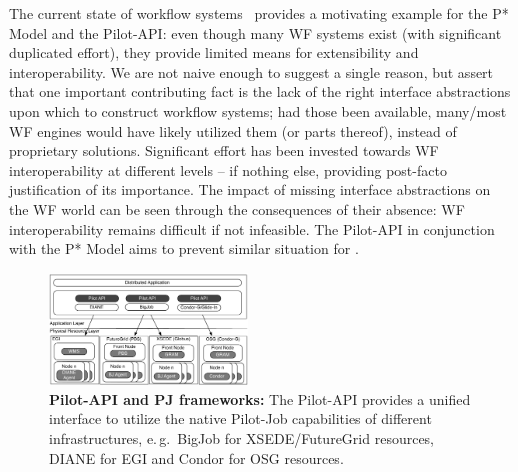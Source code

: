\documentclass{sig-alternate}
\begin{document}
The current state of workflow systems~\cite{nsf-workflow,1196459}
provides a motivating example for the P* Model and the Pilot-API:
even though many WF systems exist (with significant duplicated
effort), they provide limited means for extensibility and
interoperability.  We are not naive enough to suggest a single reason,
but assert that one important contributing fact is the lack of the
right interface abstractions upon which to construct workflow systems;
had those been available, many/most WF engines would have likely
utilized them (or parts thereof), instead of proprietary solutions.
%
%
Significant effort has been invested towards WF interoperability at
different levels -- if nothing else, providing post-facto
justification of its importance. The impact of missing interface
abstractions on the WF world can be seen through the consequences of
their absence: WF interoperability remains difficult if not
infeasible. The Pilot-API in conjunction with the P* Model aims to
prevent similar situation for \pilotjobs.



% 


\begin{figure}[b]
    \centering
    \up\up
    \includegraphics[width=0.47\textwidth]{figures/distributed_pilot_job.pdf}
    \caption{\textbf{Pilot-API and PJ frameworks:} The Pilot-API provides 
      a unified interface to utilize the native Pilot-Job capabilities of
      different infrastructures, e.\,g.\ BigJob for XSEDE/FutureGrid
      resources, DIANE for EGI and Condor for OSG resources.
  }
    \label{fig:figures_distributed_pilot_job}
\end{figure}
\end{document}
